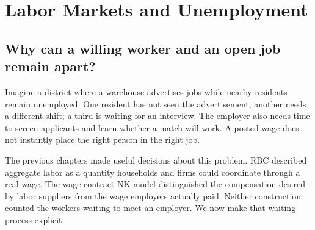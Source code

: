 \section{Labor Markets and Unemployment}\label{sec:labor-markets}

%
%
%

\subsection{Why can a willing worker and an open job remain apart?}

Imagine a district where a warehouse advertises jobs while nearby residents
remain unemployed. One resident has not seen the advertisement; another needs
a different shift; a third is waiting for an interview. The employer also needs
time to screen applicants and learn whether a match will work. A posted wage
does not instantly place the right person in the right job.

The previous chapters made useful decisions about this problem. RBC described
aggregate labor as a quantity households and firms could coordinate through a
real wage. The wage-contract NK model distinguished the compensation desired
by labor suppliers from the wage employers actually paid. Neither construction
counted the workers waiting to meet an employer. We now make that waiting
process explicit.

